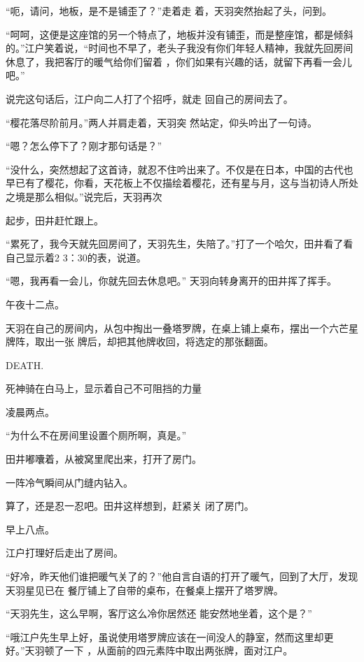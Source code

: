 \documentclass{article}
\begin{document}
\newpage

“呃，请问，地板，是不是铺歪了？”走着走
着，天羽突然抬起了头，问到。 

“呵呵，这便是这座馆的另一个特点了，地板并没有铺歪，而是整座馆，都是倾斜的。”江户笑着说，“时间也不早了，老头子我没有你们年轻人精神，我就先回房间休息了，我把客厅的暖气给你们留着
，你们如果有兴趣的话，就留下再看一会儿吧。” 

说完这句话后，江户向二人打了个招呼，就走
回自己的房间去了。 

“樱花落尽阶前月。”两人并肩走着，天羽突
然站定，仰头吟出了一句诗。 


“嗯？怎么停下了？刚才那句话是？” 

“没什么，突然想起了这首诗，就忍不住吟出来了。不仅是在日本，中国的古代也早已有了樱花，你看，天花板上不仅描绘着樱花，还有星与月，这与当初诗人所处之境是那么相似。”说完后，天羽再次
\newpage

起步，田井赶忙跟上。 

“累死了，我今天就先回房间了，天羽先生，失陪了。”打了一个哈欠，田井看了看自己显示着2
3：30的表，说道。 

“嗯，我再看一会儿，你就先回去休息吧。”
天羽向转身离开的田井挥了挥手。 


午夜十二点。 

天羽在自己的房间内，从包中掏出一叠塔罗牌，在桌上铺上桌布，摆出一个六芒星牌阵，取出一张
牌后，却把其他牌收回，将选定的那张翻面。 


DEATH. 

死神骑在白马上，显示着自己不可阻挡的力量


凌晨两点。 

\newpage

“为什么不在房间里设置个厕所啊，真是。”
 

田井嘟囔着，从被窝里爬出来，打开了房门。


一阵冷气瞬间从门缝内钻入。 

算了，还是忍一忍吧。田井这样想到，赶紧关
闭了房门。 


早上八点。 


江户打理好后走出了房间。 

“好冷，昨天他们谁把暖气关了的？”他自言自语的打开了暖气，回到了大厅，发现天羽星见已在
餐厅铺上了自带的桌布，在餐桌上摆开了塔罗牌。 

“天羽先生，这么早啊，客厅这么冷你居然还
能安然地坐着，这个是？” 

\newpage

“哦江户先生早上好，虽说使用塔罗牌应该在一间没人的静室，然而这里却更好。”天羽顿了一下
，从面前的四元素阵中取出两张牌，面对江户。 
\end{document}
